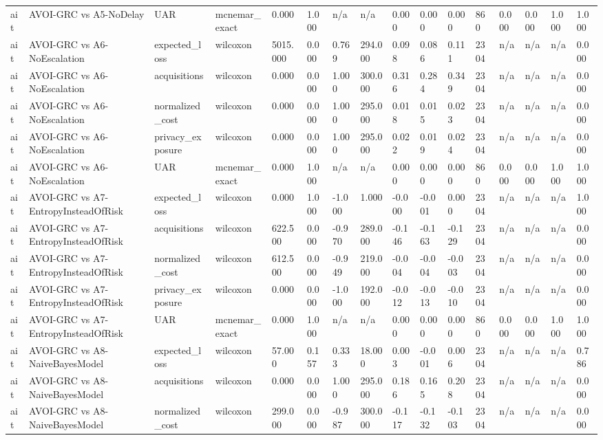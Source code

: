 \begin{table}[!ht]
{\begin{tabular}{llllllllllllllll}
ait & AVOI-GRC vs A5-NoDelay & UAR & mcnemar\_exact & 0.000 & 1.000 & n/a & n/a & 0.000 & 0.000 & 0.000 & 860 & 0.000 & 0.000 & 1.000 & 1.000 \\
ait & AVOI-GRC vs A6-NoEscalation & expected\_loss & wilcoxon & 5015.000 & 0.000 & 0.769 & 294.000 & 0.098 & 0.086 & 0.111 & 2304 & n/a & n/a & n/a & 0.000 \\
ait & AVOI-GRC vs A6-NoEscalation & acquisitions & wilcoxon & 0.000 & 0.000 & 1.000 & 300.000 & 0.316 & 0.284 & 0.349 & 2304 & n/a & n/a & n/a & 0.000 \\
ait & AVOI-GRC vs A6-NoEscalation & normalized\_cost & wilcoxon & 0.000 & 0.000 & 1.000 & 295.000 & 0.018 & 0.015 & 0.023 & 2304 & n/a & n/a & n/a & 0.000 \\
ait & AVOI-GRC vs A6-NoEscalation & privacy\_exposure & wilcoxon & 0.000 & 0.000 & 1.000 & 295.000 & 0.022 & 0.019 & 0.024 & 2304 & n/a & n/a & n/a & 0.000 \\
ait & AVOI-GRC vs A6-NoEscalation & UAR & mcnemar\_exact & 0.000 & 1.000 & n/a & n/a & 0.000 & 0.000 & 0.000 & 860 & 0.000 & 0.000 & 1.000 & 1.000 \\
ait & AVOI-GRC vs A7-EntropyInsteadOfRisk & expected\_loss & wilcoxon & 0.000 & 1.000 & -1.000 & 1.000 & -0.000 & -0.001 & 0.000 & 2304 & n/a & n/a & n/a & 1.000 \\
ait & AVOI-GRC vs A7-EntropyInsteadOfRisk & acquisitions & wilcoxon & 622.500 & 0.000 & -0.970 & 289.000 & -0.146 & -0.163 & -0.129 & 2304 & n/a & n/a & n/a & 0.000 \\
ait & AVOI-GRC vs A7-EntropyInsteadOfRisk & normalized\_cost & wilcoxon & 612.500 & 0.000 & -0.949 & 219.000 & -0.004 & -0.004 & -0.003 & 2304 & n/a & n/a & n/a & 0.000 \\
ait & AVOI-GRC vs A7-EntropyInsteadOfRisk & privacy\_exposure & wilcoxon & 0.000 & 0.000 & -1.000 & 192.000 & -0.012 & -0.013 & -0.010 & 2304 & n/a & n/a & n/a & 0.000 \\
ait & AVOI-GRC vs A7-EntropyInsteadOfRisk & UAR & mcnemar\_exact & 0.000 & 1.000 & n/a & n/a & 0.000 & 0.000 & 0.000 & 860 & 0.000 & 0.000 & 1.000 & 1.000 \\
ait & AVOI-GRC vs A8-NaiveBayesModel & expected\_loss & wilcoxon & 57.000 & 0.157 & 0.333 & 18.000 & 0.003 & -0.001 & 0.006 & 2304 & n/a & n/a & n/a & 0.786 \\
ait & AVOI-GRC vs A8-NaiveBayesModel & acquisitions & wilcoxon & 0.000 & 0.000 & 1.000 & 295.000 & 0.186 & 0.165 & 0.208 & 2304 & n/a & n/a & n/a & 0.000 \\
ait & AVOI-GRC vs A8-NaiveBayesModel & normalized\_cost & wilcoxon & 299.000 & 0.000 & -0.987 & 300.000 & -0.117 & -0.132 & -0.103 & 2304 & n/a & n/a & n/a & 0.000 \\

\end{tabular}}
\end{table}
